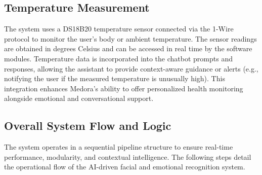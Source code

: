 \subsection{ Temperature Measurement}
The system uses a DS18B20 temperature sensor connected via the 1-Wire protocol to monitor the user’s body or ambient temperature. The sensor readings are obtained in degrees Celsius and can be accessed in real time by the software modules. Temperature data is incorporated into the chatbot prompts and responses, allowing the assistant to provide context-aware guidance or alerts (e.g., notifying the user if the measured temperature is unusually high). This integration enhances Medora's ability to offer personalized health monitoring alongside emotional and conversational support.


\subsection{Overall System Flow and Logic}
The system operates in a sequential pipeline structure to ensure real-time performance, modularity, and contextual intelligence. The following steps detail the operational flow of the AI-driven facial and emotional recognition system.
